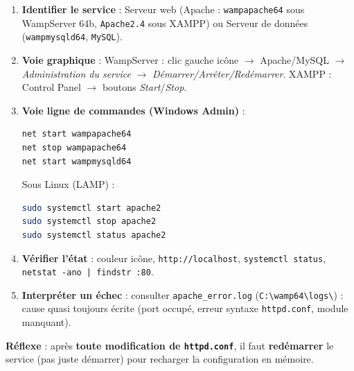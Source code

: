 \documentclass[11pt]{article}
\begin{document}
\begin{methode}
\begin{enumerate}
\item \textbf{Identifier le service} : Serveur web (Apache : \texttt{wampapache64} sous WampServer 64b, \texttt{Apache2.4} sous XAMPP) ou Serveur de données (\texttt{wampmysqld64}, \texttt{MySQL}).
\item \textbf{Voie graphique} : WampServer : clic gauche icône $\rightarrow$ Apache/MySQL $\rightarrow$ \emph{Administration du service} $\rightarrow$ \emph{Démarrer/Arrêter/Redémarrer}. XAMPP : Control Panel $\rightarrow$ boutons \emph{Start}/\emph{Stop}.
\item \textbf{Voie ligne de commandes (Windows Admin)} :
\begin{lstlisting}[language=bash]
net start wampapache64
net stop wampapache64
net start wampmysqld64
\end{lstlisting}
Sous Linux (LAMP) :
\begin{lstlisting}[language=bash]
sudo systemctl start apache2
sudo systemctl stop apache2
sudo systemctl status apache2
\end{lstlisting}
\item \textbf{Vérifier l'état} : couleur icône, \texttt{http://localhost}, \texttt{systemctl status}, \texttt{netstat -ano | findstr :80}.
\item \textbf{Interpréter un échec} : consulter \texttt{apache\_error.log} (\texttt{C:\textbackslash wamp64\textbackslash logs\textbackslash}) : cause quasi toujours écrite (port occupé, erreur syntaxe \texttt{httpd.conf}, module manquant).
\end{enumerate}
\textbf{Réflexe} : après \textbf{toute modification de \texttt{httpd.conf}}, il faut \textbf{redémarrer} le service (pas juste démarrer) pour recharger la configuration en mémoire.
\end{methode}
\end{document}
